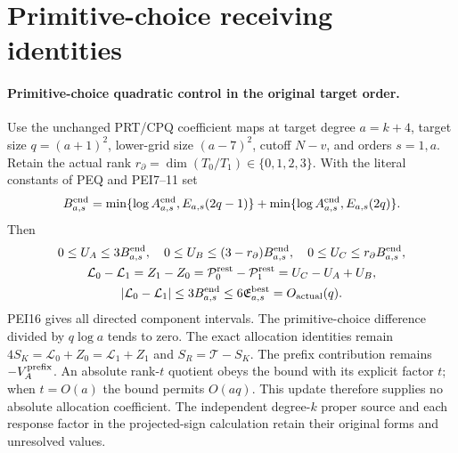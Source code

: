 \endgroup

\clearpage
\begingroup


\setcounter{equation}{0}
\renewcommand{\theequation}{PEQR.\arabic{equation}}
\section*{Primitive-choice receiving identities}
\paragraph{Primitive-choice quadratic control in the original target order.}
Use the unchanged PRT/CPQ coefficient maps at target degree $a=k+4$,
target size $q=(a+1)^2$, lower-grid size $(a-7)^2$, cutoff $N-v$,
and orders $s=1,a$. Retain the actual rank
$r_\partial=\dim(T_0/T_1)\in\{0,1,2,3\}$.
With the literal constants of PEQ and PEI7--11 set
\[
 B^{\rm end}_{a,s}=
 \min\{\log A^{\rm end}_{a,s},E_{a,s}(2q-1)\}
 +\min\{\log A^{\rm end}_{a,s},E_{a,s}(2q)\}.
\]
Then
\[
 \begin{gathered}
 0\le U_A\le3B^{\rm end}_{a,s},\quad
 0\le U_B\le(3-r_\partial)B^{\rm end}_{a,s},\quad
 0\le U_C\le r_\partial B^{\rm end}_{a,s},\\
 \mathcal L_0-\mathcal L_1=Z_1-Z_0
     =\mathcal P^{\rm rest}_0-\mathcal P^{\rm rest}_1
     =U_C-U_A+U_B,\\
 |\mathcal L_0-\mathcal L_1|
 \le3B^{\rm end}_{a,s}\le6\mathfrak E^{\rm best}_{a,s}
       =O_{\rm actual}(q).
 \end{gathered}
\]
PEI16 gives all directed component intervals. The primitive-choice
difference divided by $q\log a$ tends to zero. The exact allocation
identities remain
$4S_K=\mathcal L_0+Z_0=\mathcal L_1+Z_1$ and
$S_R=\mathcal T-S_K$. The prefix contribution remains
$-V_A^{\rm prefix}$. An absolute rank-$t$ quotient obeys the bound
with its explicit factor $t$; when $t=O(a)$ the bound permits
$O(aq)$. This update therefore supplies no absolute allocation
coefficient. The independent degree-$k$ proper source and each
response factor in the projected-sign calculation retain their
original forms and unresolved values.

\endgroup

